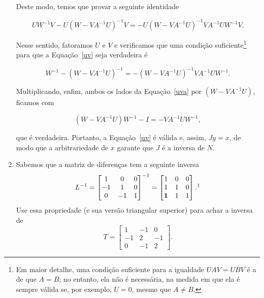 \documentclass[leqno]{article}
\begin{document}
\begin{enumerate}
\begin{sol}
	\noindent Deste modo, temos que provar a seguinte identidade 

	\begin{equation} \label{uv}  
		UW^{-1}V - U(W - VA^{-1}U)^{-1}V = -U(W - VA^{-1}U)^{-1}VA^{-1}UW^{-1}V.  
	\end{equation} 

	\noindent Nesse sentido, fatoramos $U$ e $V$ e verificamos que uma condição suficiente\footnote{Em maior detalhe, uma condição suficiente para a igualdade $UAV = UBV$ é a de que $A = B$; no entanto, ela não é necessária, na medida em que ela é sempre válida se, por exemplo, $U = 0$, mesmo que $A \neq B$.} para que a Equação~\eqref{uv} seja verdadeira é 

	\begin{equation} \label{uva}  
		W^{-1} - (W - VA^{-1}U)^{-1} = -(W - VA^{-1}U)^{-1}VA^{-1}UW^{-1}.  
	\end{equation} 

	\noindent Multiplicando, enfim, ambos os lados da Equação~\eqref{uva} por $(W - VA^{-1}U)$, ficamos com 

	\begin{equation*} 
		(W - VA^{-1}U)W^{-1} - I = -VA^{-1}UW^{-1},   
	\end{equation*} 

	\noindent que é verdadeira. Portanto, a Equação~\eqref{uv} é válida e, assim, $Jy = x$, de modo que a arbitrariedade de $x$ garante que $J$ é a inversa de $N$. 
\end{sol} 

\item Sabemos que a matriz de diferenças tem a seguinte inversa
$$L^{-1} = \begin{bmatrix}
1 & 0 & 0\\
-1 & 1 & 0\\
0 & -1 & 1
\end{bmatrix}^{-1} = \begin{bmatrix}
1 & 0 & 0\\
1 & 1 & 0\\
\mathbf{1} & 1 & 1
\end{bmatrix}.\footnote{Havia, no documento original, outro equívoco no enunciado: o item em negrito da matriz era nulo; no entanto, ele é unitário.}$$ 
Use essa propriedade (e sua versão triangular superior) para achar a inversa de
$$T = \begin{bmatrix}
1 & -1 & 0\\
-1 & 2 & -1\\
0 & -1 & 2
\end{bmatrix}.$$


\end{enumerate}
\end{document}
